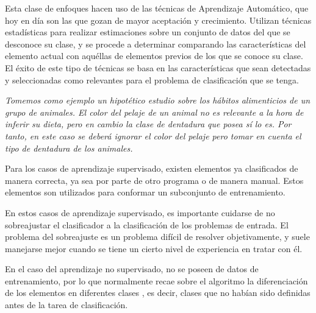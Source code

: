 \lhead{\emph{\ChapterTwo{}}}
Esta clase de enfoques hacen uso de las técnicas de Aprendizaje Automático, que hoy en día son las que gozan de mayor aceptación y crecimiento.
%
Utilizan técnicas estadísticas para realizar estimaciones sobre un conjunto de datos del que se desconoce su clase, y se procede a determinar comparando las características del elemento actual con aquéllas de elementos previos de los que se conoce su clase.
%
El éxito de este tipo de técnicas se basa en las características que sean detectadas y seleccionadas como relevantes para el problema de clasificación que se tenga.

\begin{minipage}{\linewidth}
\textit{Tomemos como ejemplo un hipotético estudio sobre los hábitos alimenticios de un grupo de animales.
El color del pelaje de un animal no es relevante a la hora de inferir su dieta, pero en cambio la clase de dentadura que posea sí lo es. Por tanto, en este caso se deberá ignorar el color del pelaje pero tomar en cuenta el tipo de dentadura de los animales.}
\end{minipage}


Para los casos de aprendizaje supervisado, existen elementos ya clasificados de manera correcta, ya sea por parte de otro programa o de manera manual. Estos elementos son utilizados para conformar un subconjunto de entrenamiento.

En estos casos de aprendizaje supervisado, es importante cuidarse de no sobreajustar el clasificador a la clasificación de los problemas de entrada. 
%
El problema del sobreajuste es un problema difícil de resolver objetivamente, y suele manejarse mejor cuando se tiene un cierto nivel de experiencia en tratar con él.

En el caso del aprendizaje no supervisado, no se poseen de datos de entrenamiento, por lo que normalmente recae sobre el algoritmo la diferenciación de los elementos en diferentes clases , es decir, clases que no habían sido definidas antes de la tarea de clasificación.



